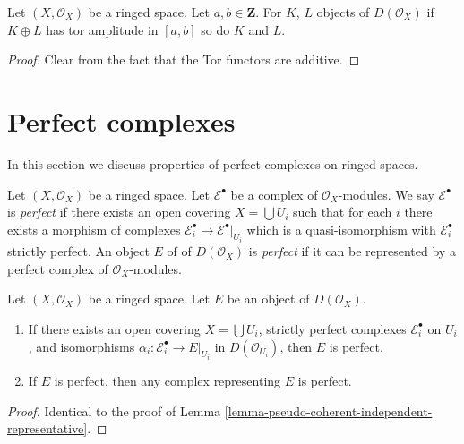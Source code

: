 \begin{lemma}
\label{lemma-summands-tor-amplitude}
Let $(X, \mathcal{O}_X)$ be a ringed space. Let $a, b \in \mathbf{Z}$.
For $K$, $L$ objects of $D(\mathcal{O}_X)$ if $K \oplus L$ has tor
amplitude in $[a, b]$ so do $K$ and $L$.
\end{lemma}

\begin{proof}
Clear from the fact that the Tor functors are additive.
\end{proof}






\section{Perfect complexes}
\label{section-perfect}

\noindent
In this section we discuss properties of perfect complexes on
ringed spaces.

\begin{definition}
\label{definition-perfect}
Let $(X, \mathcal{O}_X)$ be a ringed space.
Let $\mathcal{E}^\bullet$ be a complex of $\mathcal{O}_X$-modules.
We say $\mathcal{E}^\bullet$ is {\it perfect} if there exists
an open covering $X = \bigcup U_i$ such that for each $i$
there exists a morphism of complexes
$\mathcal{E}_i^\bullet \to \mathcal{E}^\bullet|_{U_i}$
which is a quasi-isomorphism with $\mathcal{E}_i^\bullet$
strictly perfect.
An object $E$ of of $D(\mathcal{O}_X)$ is {\it perfect}
if it can be represented by a perfect complex of $\mathcal{O}_X$-modules.
\end{definition}

\begin{lemma}
\label{lemma-perfect-independent-representative}
Let $(X, \mathcal{O}_X)$ be a ringed space.
Let $E$ be an object of $D(\mathcal{O}_X)$.
\begin{enumerate}
\item If there exists an open covering $X = \bigcup U_i$,
strictly perfect complexes $\mathcal{E}_i^\bullet$ on $U_i$,
and isomorphisms $\alpha_i : \mathcal{E}_i^\bullet \to E|_{U_i}$ in
$D(\mathcal{O}_{U_i})$, then $E$ is perfect.
\item If $E$ is perfect, then any complex representing $E$ is perfect.
\end{enumerate}
\end{lemma}

\begin{proof}
Identical to the proof of
Lemma \ref{lemma-pseudo-coherent-independent-representative}.
\end{proof}

